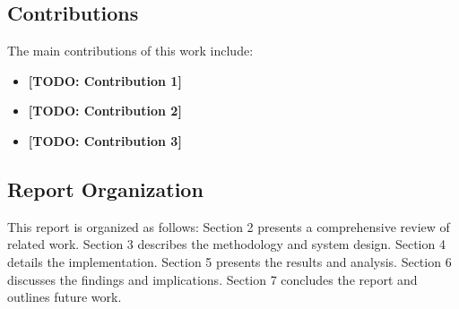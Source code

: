 \subsection{Contributions}


The main contributions of this work include:

\begin{itemize}
  \item \textbf{[TODO: Contribution 1]}
  \item \textbf{[TODO: Contribution 2]}
  \item \textbf{[TODO: Contribution 3]}
\end{itemize}

\subsection{Report Organization}

This report is organized as follows: Section 2 presents a comprehensive review of related work. Section 3 describes the methodology and system design. Section 4 details the implementation. Section 5 presents the results and analysis. Section 6 discusses the findings and implications. Section 7 concludes the report and outlines future work.